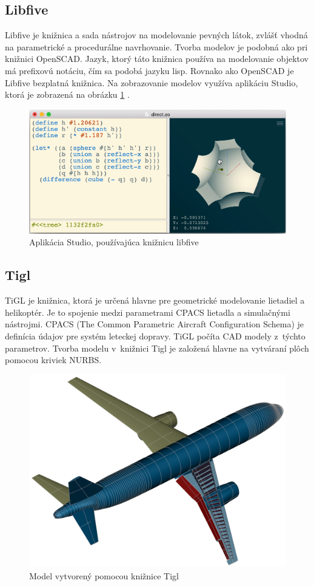 \subsection*{Libfive}
Libfive je knižnica  a sada nástrojov na modelovanie pevných látok, zvlášť vhodná na parametrické a procedurálne navrhovanie. Tvorba modelov je podobná ako pri knižnici OpenSCAD. Jazyk, ktorý táto knižnica používa na modelovanie objektov má prefixovú notáciu, čím sa podobá jazyku lisp. Rovnako ako OpenSCAD je Libfive bezplatná  knižnica. Na zobrazovanie modelov využíva aplikáciu Studio, ktorá je zobrazená na obrázku \ref{fig:LibfiveStudio} \cite{20172019matthewkeeter2019}.\nopagebreak
\begin{figure}[H]
    \centering
    \includegraphics[width = 0.9\linewidth]{obrazky-figures/programs/libfive.png}
    \caption{Aplikácia Studio, používajúca knižnicu libfive \cite{20172019matthewkeeter2019} }
    \label{fig:LibfiveStudio}
\end{figure}


\subsection*{Tigl}
TiGL je knižnica, ktorá je určená hlavne pre geometrické modelovanie lietadiel a helikoptér. 
Je to spojenie medzi parametrami CPACS lietadla a simulačnými nástrojmi. 
CPACS (The Common Parametric Aircraft Configuration Schema) je definícia údajov pre systém leteckej dopravy. TiGL počíta CAD modely z~týchto parametrov.
Tvorba modelu v~knižnici Tigl je založená hlavne na vytváraní plôch pomocou kriviek NURBS. \cite{libigl2019}\nopagebreak
\begin{figure}[H]
    \centering
    \includegraphics[width = 0.5\linewidth]{obrazky-figures/programs/tigl.png}
    \caption{Model vytvorený pomocou knižnice Tigl \cite{libigl2019} }
    \label{fig:Tigl}
\end{figure}

